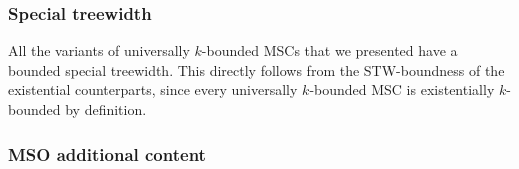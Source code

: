 \documentclass{article}
\begin{document}
\subsubsection{Special treewidth}

All the variants of universally $k$-bounded MSCs that we presented have a bounded special treewidth. This directly follows from the STW-boundness of the existential counterparts, since every universally $k$-bounded MSC is existentially $k$-bounded by definition.

\subsubsection{MSO additional content}\label{sec:mso_extra}




\printbibliography
\end{document}
